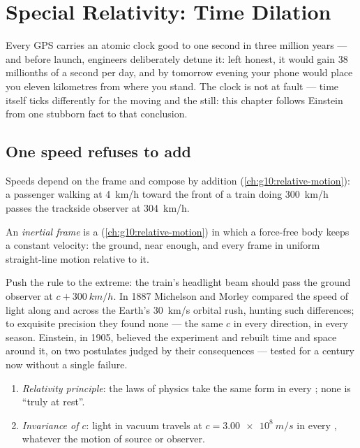 \chapter{Special Relativity: Time Dilation}\label{ch:g12:special-relativity}

Every GPS  carries an atomic clock good to one second in three
million years --- and before launch, engineers deliberately detune it: left
honest, it would gain 38 millionths of a second per day, and by tomorrow
evening your phone would place you eleven kilometres from where you stand.
The clock is not at fault --- time itself ticks differently for the moving and
the still: this chapter follows Einstein from one stubborn fact to that conclusion.

\section{One speed refuses to add}

Speeds depend on the frame and compose by addition
(\cref{ch:g10:relative-motion}): a passenger walking at \qty{4}{km/h} toward the
front of a train doing \qty{300}{km/h} passes the trackside observer at \qty{304}{km/h}.

\begin{definition}\label{def:g12:special-relativity:inertial}
An \emph{inertial frame} is a 
(\cref{ch:g10:relative-motion}) in which a force-free body keeps a constant
velocity: the ground, near enough, and every frame in uniform
straight-line motion relative to it.
\end{definition}

Push the rule to the extreme: the train's headlight beam should pass the
ground observer at $c + \qty{300}{km/h}$. In 1887 Michelson and Morley
compared the speed of light along and across the Earth's \qty{30}{km/s}
orbital rush, hunting such differences; to exquisite precision they found
none --- the same $c$ in every direction, in every season. Einstein, in 1905,
believed the experiment and rebuilt time and space around it, on two postulates
judged by their consequences --- tested for a century now without a single failure.

\begin{theorem}\label{thm:g12:special-relativity:postulates}
\begin{enumerate}
  \item \emph{Relativity principle}: the laws of physics take the same
        form in every ; none is ``truly at rest''.
  \item \emph{Invariance of $c$}: light in vacuum travels at
        $c = \qty{3.00e8}{m/s}$ in every , whatever the
        motion of source or observer.
\end{enumerate}
\end{theorem}
\admitted

